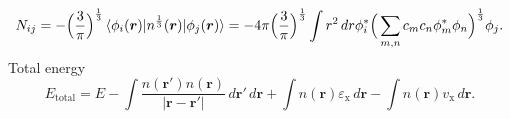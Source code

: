 \documentclass[12pt]{article}
\begin{document}
\begin{enumerate}[(a)]
\begin{equation}
              N_{ij} = - \Big( \frac{3}{\pi}\Big)^{\frac{1}{3}}
              \braket{\phi_{i} (\bm{r}) |
                  n^{\frac{1}{3}}(\bm{r})
                  | \phi_{j} (\bm{r})}
              = -4\pi\Big( \frac{3}{\pi}\Big)^{\frac{1}{3}}
              \int r^2 \, d r \phi_{i}^\ast
              \Big(\sum_{m, n} c_m c_n  \phi_{m}^\ast  \phi_{n} \Big)^{\frac{1}{3}}
              \phi_{j}.
          \end{equation}
          Total energy
          \begin{equation}
              E_{\text{total}} = E -
              \int \frac{n(\bm{r}')n(\bm{r})}{\lvert \bm{r} - \bm{r}' \rvert} \, d\bm{r}'\, d\bm{r} +
              \int n(\bm{r}) \varepsilon_{\text{x}}\, d\bm{r} -
              \int n(\bm{r}) v_{\text{x}} \, d\bm{r}.
          \end{equation}







\end{enumerate}
\end{document}
